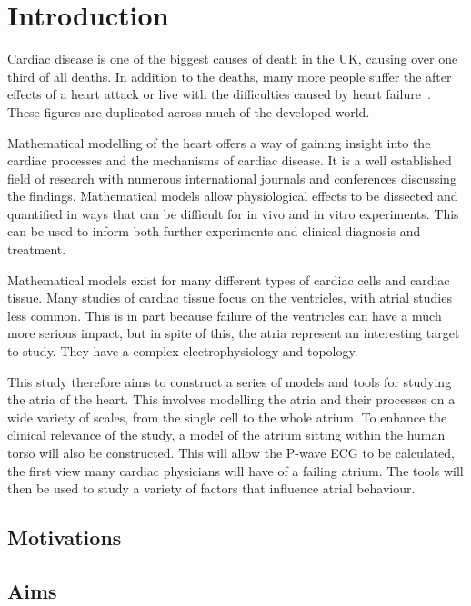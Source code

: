 \chapter{Introduction}

Cardiac disease is one of the biggest causes of death in the UK, causing over
one third of all deaths.
In addition to the deaths, many more people suffer the after effects of a heart
attack or live with the difficulties caused by heart failure~\cite{bhf2008}.
These figures are duplicated across much of the developed world.

Mathematical modelling of the heart offers a way of gaining insight into the
cardiac processes and the mechanisms of cardiac disease.
It is a well established field of research with numerous international journals
and conferences discussing the findings.
Mathematical models allow physiological effects to be dissected and quantified
in ways that can be difficult for in vivo and in vitro experiments.
This can be used to inform both further experiments and clinical diagnosis and
treatment.

Mathematical models exist for many different types of cardiac cells and
cardiac tissue.
Many studies of cardiac tissue focus on the ventricles, with atrial studies less
common.
This is in part because failure of the ventricles can have a much more serious
impact, but in spite of this, the atria represent an interesting target to
study.
They have a complex electrophysiology and topology.

This study therefore aims to construct a series of models and tools for studying
the atria of the heart.
This involves modelling the atria and their processes on a wide variety of scales,
from the single cell to the whole atrium.
To enhance the clinical relevance of the study, a model of the atrium sitting
within the human torso will also be constructed.
This will allow the P-wave ECG to be calculated, the first view many cardiac
physicians will have of a failing atrium.
The tools will then be used to study a variety of factors that influence atrial
behaviour.

\section{Motivations}




\section{Aims}

